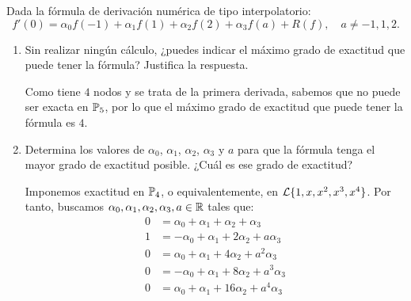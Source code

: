 \begin{ejercicio}\label{ej:2.2.6}
    Dada la fórmula de derivación numérica de tipo interpolatorio:
    \[
    f'(0) = \alpha_0 f(-1) + \alpha_1 f(1) + \alpha_2 f(2) + \alpha_3 f(a) + R(f), \quad a \neq -1, 1, 2.
    \]
    \begin{enumerate}
        \item Sin realizar ningún cálculo, ¿puedes indicar el máximo grado de exactitud que puede tener la fórmula? Justifica la respuesta.
        
        Como tiene $4$ nodos y se trata de la primera derivada, sabemos que no puede ser exacta en $\mathbb{P}_5$, por lo que el máximo grado de exactitud que puede tener la fórmula es $4$.
        
        \item Determina los valores de $\alpha_0$, $\alpha_1$, $\alpha_2$, $\alpha_3$ y $a$ para que la fórmula tenga el mayor grado de exactitud posible. ¿Cuál es ese grado de exactitud?
        
        Imponemos exactitud en $\mathbb{P}_4$, o equivalentemente, en $\mathcal{L}\{1, x, x^2,x^3,x^4\}$. Por tanto, buscamos $\alpha_0,\alpha_1,\alpha_2,\alpha_3, a\in\mathbb{R}$ tales que:
        \begin{align*}
            0 &= \alpha_0 + \alpha_1 + \alpha_2 + \alpha_3 \\
            1 &= -\alpha_0 + \alpha_1 + 2\alpha_2 + a\alpha_3 \\
            0 &= \alpha_0 + \alpha_1 + 4\alpha_2 + a^2\alpha_3 \\
            0 &= -\alpha_0 + \alpha_1 + 8\alpha_2 + a^3\alpha_3 \\
            0 &= \alpha_0 + \alpha_1 + 16\alpha_2 + a^4\alpha_3
        \end{align*}


\end{enumerate}
\end{ejercicio}
